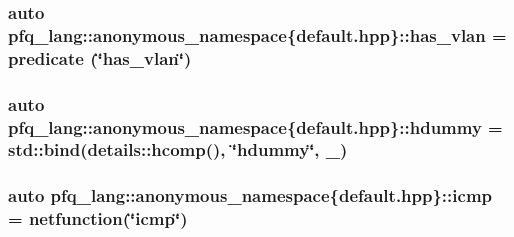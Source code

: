 \hypertarget{namespacepfq__lang_1_1anonymous__namespace_02default_8hpp_03_a30a0c8d9bcd28cd17c6c1699c3339c3f}{
\subsubsection[{has\+\_\+vlan}]{\setlength{\rightskip}{0pt plus 5cm}auto pfq\+\_\+lang\+::anonymous\+\_\+namespace\{default.\+hpp\}\+::has\+\_\+vlan = {\bf predicate} (\char`\"{}has\+\_\+vlan\char`\"{})}}\label{namespacepfq__lang_1_1anonymous__namespace_02default_8hpp_03_a30a0c8d9bcd28cd17c6c1699c3339c3f}
\hypertarget{namespacepfq__lang_1_1anonymous__namespace_02default_8hpp_03_a4e7cf4874b42c5722f420fc54f360242}{
\subsubsection[{hdummy}]{\setlength{\rightskip}{0pt plus 5cm}auto pfq\+\_\+lang\+::anonymous\+\_\+namespace\{default.\+hpp\}\+::hdummy = std\+::bind(details\+::hcomp(), \char`\"{}hdummy\char`\"{}, \+\_)}}\label{namespacepfq__lang_1_1anonymous__namespace_02default_8hpp_03_a4e7cf4874b42c5722f420fc54f360242}
\hypertarget{namespacepfq__lang_1_1anonymous__namespace_02default_8hpp_03_a180c8185595965a528fd2590da7dbeb9}{
\subsubsection[{icmp}]{\setlength{\rightskip}{0pt plus 5cm}auto pfq\+\_\+lang\+::anonymous\+\_\+namespace\{default.\+hpp\}\+::icmp = {\bf netfunction}(\char`\"{}icmp\char`\"{})}}\label{namespacepfq__lang_1_1anonymous__namespace_02default_8hpp_03_a180c8185595965a528fd2590da7dbeb9}
